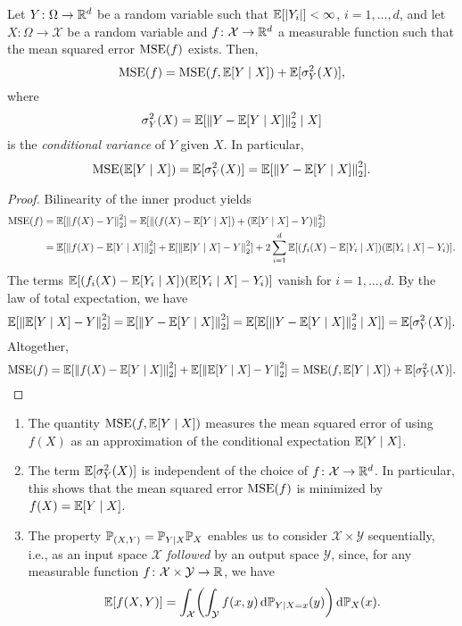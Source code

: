 \begin{proposition}
\label{prop: decomposition of mean-squared error}
Let $Y \colon \Omega \to \mathbb{R}^d$ be a random variable such that $\operatorname{\mathbb{E}}[\abs{Y_i}] < \infty$, $i = 1, \dots, d$, and let $X \colon \Omega \to \mathcal{X}$ be a random variable and $f \colon \mathcal{X} \to \mathbb{R}^d$ a measurable function such that the mean squared error $\operatorname{MSE}(f)$ exists. Then,
\[
    \operatorname{MSE}(f) = \operatorname{MSE}(f, \operatorname{\mathbb{E}}[Y \mathrel{|} X]) + \operatorname{\mathbb{E}}[\sigma_Y^2(X)],
\]
where
\[
    \sigma_Y^2(X) = \operatorname{\mathbb{E}}[\norm{Y - \operatorname{\mathbb{E}}[Y \mathrel{|} X]}_2^2 \mathrel{|} X]
\]
is the \emph{conditional variance} of $Y$ given $X$. In particular,
\[
    \operatorname{MSE}(\operatorname{\mathbb{E}}[Y \mathrel{|} X]) = \operatorname{\mathbb{E}}[\sigma_Y^2(X)] = \operatorname{\mathbb{E}}[\norm{Y - \operatorname{\mathbb{E}}[Y \mathrel{|} X]}_2^2].
\]
\end{proposition}

\begin{proof}
Bilinearity of the inner product yields
\begin{align*}
    \operatorname{MSE}(f) &= \operatorname{\mathbb{E}}[\norm{f(X) - Y}_2^2] = \operatorname{\mathbb{E}}[\norm{(f(X) - \operatorname{\mathbb{E}}[Y \mathrel{|} X]) + (\operatorname{\mathbb{E}}[Y \mathrel{|} X] - Y)}_2^2] \\
    &= \operatorname{\mathbb{E}}[\norm{f(X) - \operatorname{\mathbb{E}}[Y \mathrel{|} X]}_2^2] + \operatorname{\mathbb{E}}[\norm{\operatorname{\mathbb{E}}[Y \mathrel{|} X] - Y}_2^2] + 2 \sum_{i=1}^d \operatorname{\mathbb{E}}[(f_i(X) - \operatorname{\mathbb{E}}[Y_i \mathrel{|} X]) (\operatorname{\mathbb{E}}[Y_i \mathrel{|} X] - Y_i)].
\end{align*}
The terms $\operatorname{\mathbb{E}}[(f_i(X) - \operatorname{\mathbb{E}}[Y_i \mathrel{|} X]) (\operatorname{\mathbb{E}}[Y_i \mathrel{|} X] - Y_i)]$ vanish for $i = 1, \dots, d$. By the law of total expectation, we have
\[
    \operatorname{\mathbb{E}}[\norm{\operatorname{\mathbb{E}}[Y \mathrel{|} X] - Y}_2^2] = \operatorname{\mathbb{E}}[\norm{Y - \operatorname{\mathbb{E}}[Y \mathrel{|} X]}_2^2] = \operatorname{\mathbb{E}}[\operatorname{\mathbb{E}}[\norm{Y - \operatorname{\mathbb{E}}[Y \mathrel{|} X]}_2^2 \mathrel{|} X]] = \operatorname{\mathbb{E}}[\sigma_Y^2(X)].
\]
Altogether,
\[
    \operatorname{MSE}(f) = \operatorname{\mathbb{E}}[\norm{f(X) - \operatorname{\mathbb{E}}[Y \mathrel{|} X]}_2^2] + \operatorname{\mathbb{E}}[\norm{\operatorname{\mathbb{E}}[Y \mathrel{|} X] - Y}_2^2] = \operatorname{MSE}(f, \operatorname{\mathbb{E}}[Y \mathrel{|} X]) + \operatorname{\mathbb{E}}[\sigma_Y^2(X)]. \qedhere
\]
\end{proof}

\begin{remark}
\label{rmk: input-output}
\begin{enumerate}
    \item The quantity $\operatorname{MSE}(f, \operatorname{\mathbb{E}}[Y \mathrel{|} X])$ measures the mean squared error of using $f(X)$ as an approximation of the conditional expectation $\operatorname{\mathbb{E}}[Y \mathrel{|} X]$.

    \item The term $\operatorname{\mathbb{E}}[\sigma_Y^2(X)]$ is independent of the choice of $f \colon \mathcal{X} \to \mathbb{R}^d$. In particular, this shows that the mean squared error $\operatorname{MSE}(f)$ is minimized by $f(X) = \operatorname{\mathbb{E}}[Y \mathrel{|} X]$.

    \item The property $\mathbb{P}_{(X, Y)} = \mathbb{P}_{Y \mathrel{|} X} \mathbb{P}_X$ enables us to consider $\mathcal{X} \times \mathcal{Y}$ sequentially, i.e., as an input space $\mathcal{X}$ \emph{followed} by an output space $\mathcal{Y}$, since, for any measurable function $f \colon \mathcal{X} \times \mathcal{Y} \to \mathbb{R}$, we have
        \[
            \Exp[f(X, Y)] = \int_{\mathcal{X}} \left( \int_{\mathcal{Y}} f(x, y) \dP_{Y \given X=x}(y) \right) \dP_X(x).
        \]
\end{enumerate}
\end{remark}
